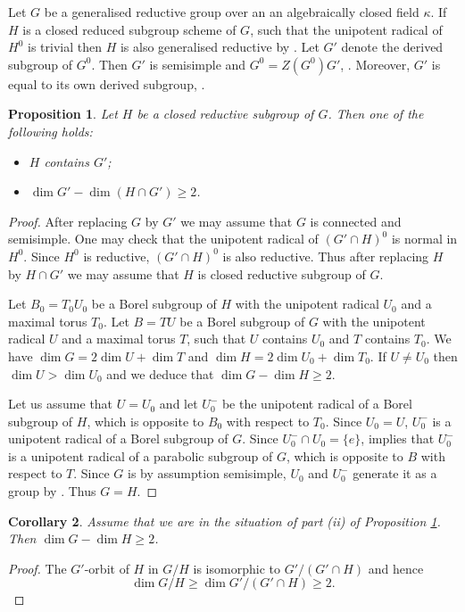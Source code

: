 \documentclass{amsart}
\newtheorem{prop}{Proposition}[section]
\newtheorem{cor}[prop]{Corollary}
\theoremstyle{definition}
\theoremstyle{remark}
\begin{document}
 Let $G$ be a generalised reductive group over an an algebraically closed field $\kappa$.
 If $H$ is a closed reduced subgroup scheme of $G$, such that the unipotent 
 radical of $H^0$ is trivial then $H$ is also generalised reductive by . Let $G'$ denote 
 the derived subgroup of $G^0$. Then $G'$ is semisimple and $G^0= Z(G^0) G'$, \cite[14.2]{borel}. Moreover, $G'$ is equal to its 
 own derived subgroup, \cite[Example 1.1.16]{conrad}.
 
 \begin{prop}\label{bound_subred} 
 Let $H$ be a closed reductive subgroup of 
 $G$. Then one of the following holds: 
 \begin{itemize} 
 \item[(i)] $H$ contains $G'$;
 \item[(ii)] $\dim G' - \dim (H\cap G')\ge 2$.
 \end{itemize}
 \end{prop}
 \begin{proof} After replacing $G$ by $G'$ we may assume that 
 $G$ is connected and semisimple. One may check that 
 the unipotent radical of $(G'\cap H)^0$ is normal in $H^0$. Since $H^0$ is reductive, $(G'\cap H)^0$ is also reductive. Thus after replacing $H$ by 
 $H\cap G'$ we may assume that $H$ is closed 
 reductive subgroup 
 of $G$.
 
 Let $B_0=T_0 U_0$ be a Borel subgroup of $H$ with the unipotent radical $U_0$ and a maximal torus $T_0$. Let $B=T U$ be a Borel 
 subgroup of $G$ with the unipotent radical $U$ and a maximal torus $T$, such that $U$ contains
 $U_0$ and $T$ contains $T_0$. We have $\dim G = 2\dim U + \dim T$ and $\dim H = 2 \dim U_0 +\dim T_0$. If $U\neq U_0$ then $\dim U >\dim U_0$ and we deduce that $\dim G -\dim H \ge 2$. 
 
 Let us assume that $U=U_0$ and let $U^-_0$ be the unipotent radical of a Borel subgroup of $H$, which is opposite to $B_0$ with respect to $T_0$. Since $U_0=U$, $U_0^-$ is a
 unipotent radical of a Borel subgroup of $G$. 
 Since $U_0^-\cap U_0=\{e\}$,  \cite[Proposition 4.10 e)]{BoTi} implies that $U^-_0$ is a unipotent radical of a parabolic subgroup of $G$, which is opposite to $B$ with respect to $T$. Since $G$ is by assumption semisimple, $U_0$ and $U_0^{-}$ generate
 it as a group by \cite[Theorem 8.1.5(i)]{springer}. Thus $G=H$.
 \end{proof} 
 
 \begin{cor}\label{cor_one} Assume that we are 
 in the situation of part (ii) of Proposition \ref{bound_subred}. Then $\dim G -\dim H \ge 2$.
 \end{cor}
 \begin{proof} The $G'$-orbit of 
 $H$ in $G/H$ is isomorphic to $G'/(G'\cap H)$ and hence 
 $$\dim G/H \ge \dim G'/(G'\cap H)\ge 2.$$ 
 \end{proof}
 
\end{document}
